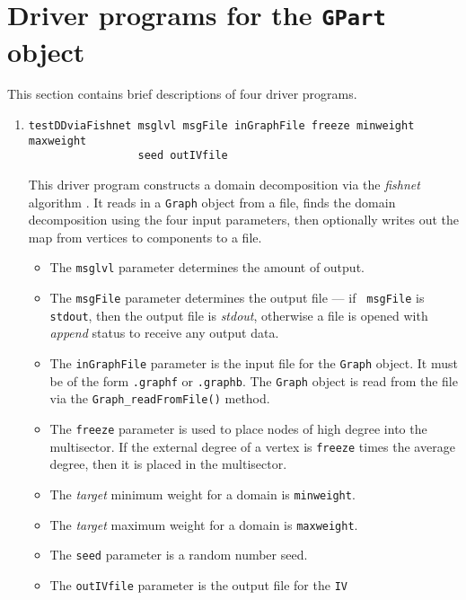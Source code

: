 \par
\section{Driver programs for the {\tt GPart} object}
\label{section:GPart:drivers}
\par
This section contains brief descriptions of four driver programs.
\par
\begin{enumerate}
\item
\begin{verbatim}
testDDviaFishnet msglvl msgFile inGraphFile freeze minweight maxweight
                 seed outIVfile
\end{verbatim}
This driver program constructs a domain decomposition via the {\it
fishnet} algorithm \cite{ash97-DDSEP}.
It reads in a {\tt Graph} object from a file, finds the domain
decomposition using the four input parameters, then optionally
writes out the map from vertices to components to a file.
\par
\begin{itemize}
\item
The {\tt msglvl} parameter determines the amount of output.
\item
The {\tt msgFile} parameter determines the output file --- if {\tt
msgFile} is {\tt stdout}, then the output file is {\it stdout},
otherwise a file is opened with {\it append} status to receive any
output data.
\item
The {\tt inGraphFile} parameter is the input file for the {\tt Graph}
object. It must be of the form {\tt *.graphf} or {\tt *.graphb}.
The {\tt Graph} object is read from the file via the
{\tt Graph\_readFromFile()} method.
\item
The {\tt freeze} parameter is used to place nodes of high degree
into the multisector.
If the external degree of a vertex is {\tt freeze} times the
average degree, then it is placed in the multisector.
\item
The {\it target} minimum weight for a domain is {\tt minweight}.
\item
The {\it target} maximum weight for a domain is {\tt maxweight}.
\item
The {\tt seed} parameter is a random number seed.
\item
The {\tt outIVfile} parameter is the output file for the {\tt IV}

\end{itemize}
\end{enumerate}

